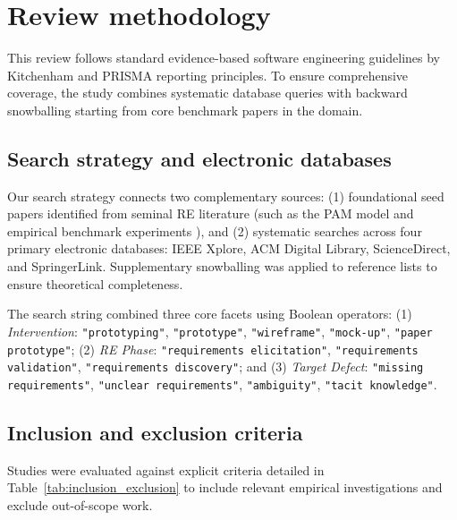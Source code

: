 \section{Review methodology}
\label{sec:methodology}

This review follows standard evidence-based software engineering guidelines by Kitchenham and PRISMA reporting principles. To ensure comprehensive coverage, the study combines systematic database queries with backward snowballing starting from core benchmark papers in the domain.

\subsection{Search strategy and electronic databases}
Our search strategy connects two complementary sources: (1) foundational seed papers identified from seminal RE literature (such as the PAM model \cite{bjarnason2023empirically} and empirical benchmark experiments \cite{rueda2020requirements}), and (2) systematic searches across four primary electronic databases: IEEE Xplore, ACM Digital Library, ScienceDirect, and SpringerLink. Supplementary snowballing was applied to reference lists to ensure theoretical completeness.

The search string combined three core facets using Boolean operators:
(1) \textit{Intervention}: \texttt{"prototyping"}, \texttt{"prototype"}, \texttt{"wireframe"}, \texttt{"mock-up"}, \texttt{"paper prototype"};
(2) \textit{RE Phase}: \texttt{"requirements elicitation"}, \texttt{"requirements validation"}, \texttt{"requirements discovery"}; and
(3) \textit{Target Defect}: \texttt{"missing requirements"}, \texttt{"unclear requirements"}, \texttt{"ambiguity"}, \texttt{"tacit knowledge"}.

\subsection{Inclusion and exclusion criteria}
Studies were evaluated against explicit criteria detailed in Table~\ref{tab:inclusion_exclusion} to include relevant empirical investigations and exclude out-of-scope work.


